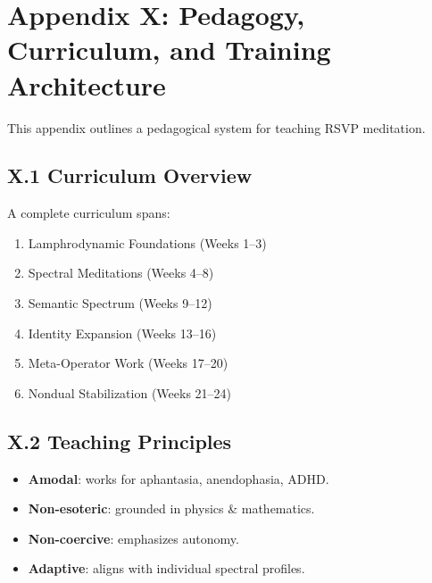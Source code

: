 \documentclass[12pt]{article}
\begin{document}

\section*{Appendix X: Pedagogy, Curriculum, and Training Architecture}

This appendix outlines a pedagogical system for teaching RSVP meditation.

\subsection*{X.1 Curriculum Overview}

A complete curriculum spans:

\begin{enumerate}
    \item Lamphrodynamic Foundations (Weeks 1–3)
    \item Spectral Meditations (Weeks 4–8)
    \item Semantic Spectrum (Weeks 9–12)
    \item Identity Expansion (Weeks 13–16)
    \item Meta-Operator Work (Weeks 17–20)
    \item Nondual Stabilization (Weeks 21–24)
\end{enumerate}

\subsection*{X.2 Teaching Principles}

\begin{itemize}
    \item \textbf{Amodal}: works for aphantasia, anendophasia, ADHD.
    \item \textbf{Non-esoteric}: grounded in physics & mathematics.
    \item \textbf{Non-coercive}: emphasizes autonomy.
    \item \textbf{Adaptive}: aligns with individual spectral profiles.
\end{itemize}

\end{document}
